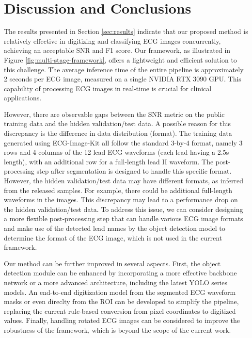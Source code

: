 \section{Discussion and Conclusions}
\label{sec:discu}


The results presented in Section \ref{sec:results} indicate that our proposed method is relatively effective in digitizing and classifying ECG images concurrently, achieving an acceptable SNR and F1 score. Our framework, as illustrated in Figure \ref{fig:multi-stage-framework}, offers a lightweight and efficient solution to this challenge. The average inference time of the entire pipeline is approximately 2 seconds per ECG image, measured on a single NVIDIA RTX 3090 GPU. This capability of processing ECG images in real-time is crucial for clinical applications.

However, there are observable gaps between the SNR metric on the public training data and the hidden validation/test data. A possible reason for this discrepancy is the difference in data distribution (format). The training data generated using ECG-Image-Kit \cite{Shivashankara_2024_ECG} all follow the standard 3-by-4 format, namely 3 rows and 4 columns of the 12-lead ECG waveforms (each lead having a 2.5s length), with an additional row for a full-length lead II waveform. The post-processing step after segmentation is designed to handle this specific format. However, the hidden validation/test data may have different formats, as inferred from the released samples. For example, there could be additional full-length waveforms in the images. This discrepancy may lead to a performance drop on the hidden validation/test data. To address this issue, we can consider designing a more flexible post-processing step that can handle various ECG image formats and make use of the detected lead names by the object detection model to determine the format of the ECG image, which is not used in the current framework.

Our method can be further improved in several aspects. First, the object detection module can be enhanced by incorporating a more effective backbone network or a more advanced architecture, including the latest YOLO series models. An end-to-end digitization model from the segmented ECG waveform masks or even direclty from the ROI can be developed to simplify the pipeline, replacing the current rule-based conversion from pixel coordinates to digitized values. Finally, handling rotated ECG images can be considered to improve the robustness of the framework, which is beyond the scope of the current work.
